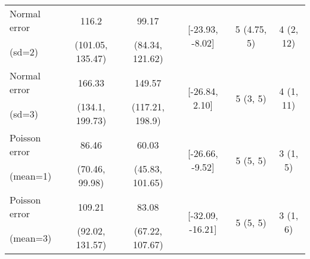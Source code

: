 \begin{table}[hbtp]
{\begin{tabular}{@{}lccccc@{}}
Normal error         & 116.2            & 99.17           & \multirow{2}{*}{{[}-23.93, -8.02{]}}                                      & \multirow{2}{*}{5 (4.75, 5)}                                               & \multirow{2}{*}{4 (2, 12)}                                                  \\
(sd=2)               & (101.05, 135.47) & (84.34, 121.62) &                                                                           &                                                                            &                                                                             \\
Normal error         & 166.33           & 149.57          & \multirow{2}{*}{{[}-26.84, 2.10{]}}                                       & \multirow{2}{*}{5 (3, 5)}                                                  & \multirow{2}{*}{4 (1, 11)}                                                  \\
(sd=3)               & (134.1, 199.73)  & (117.21, 198.9) &                                                                           &                                                                            &                                                                             \\
Poisson error        & 86.46            & 60.03           & \multirow{2}{*}{{[}-26.66, -9.52{]}}                                      & \multirow{2}{*}{5 (5, 5)}                                                  & \multirow{2}{*}{3 (1, 5)}                                                   \\
(mean=1)             & (70.46, 99.98)   & (45.83, 101.65) &                                                                           &                                                                            &                                                                             \\
Poisson error        & 109.21           & 83.08           & \multirow{2}{*}{{[}-32.09, -16.21{]}}                                     & \multirow{2}{*}{5 (5, 5)}                                                  & \multirow{2}{*}{3 (1, 6)}                                                   \\
(mean=3)             & (92.02, 131.57)  & (67.22, 107.67) &                                                                           &                                                                            &                                                                             \\

\end{tabular}}
\end{table}
